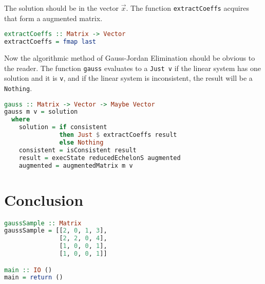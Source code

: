 \documentclass[12pt,a4paper]{article}
\begin{document}
The solution should be in the vector $\overrightarrow{x}$. The function \texttt{extractCoeffs} acquires that form a augmented matrix.
\begin{lstlisting}[language=Haskell]
extractCoeffs :: Matrix -> Vector
extractCoeffs = fmap last
\end{lstlisting}

Now the algorithmic method of Gauss-Jordan Elimination should be obvious to the reader. The function \texttt{gauss} evaluates to a \texttt{Just v} if the linear system has one solution and it is \texttt{v}, and if the linear system is inconsistent, the result will be a \texttt{Nothing}.
\begin{lstlisting}[language=Haskell]
gauss :: Matrix -> Vector -> Maybe Vector
gauss m v = solution
  where
    solution = if consistent
               then Just $ extractCoeffs result
               else Nothing
    consistent = isConsistent result
    result = execState reducedEchelonS augmented
    augmented = augmentedMatrix m v
\end{lstlisting}

\section{Conclusion}
\begin{lstlisting}[language=Haskell]
gaussSample :: Matrix
gaussSample = [[2, 0, 1, 3],
               [2, 2, 0, 4],
               [1, 0, 0, 1],
               [1, 0, 0, 1]]

main :: IO ()
main = return ()
\end{lstlisting}
\end{document}
